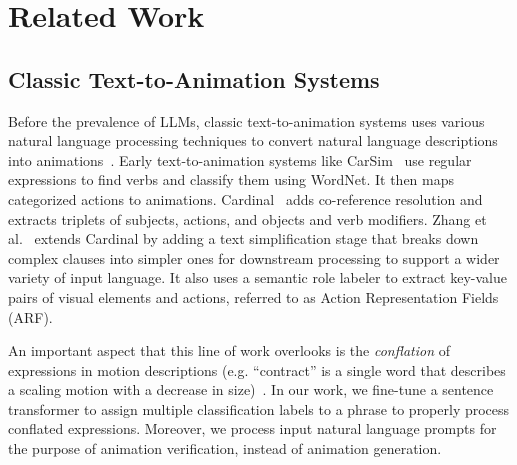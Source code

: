\section{Related Work}
\label{sec:related}


\subsection{Classic Text-to-Animation Systems}
Before the prevalence of LLMs, classic text-to-animation systems uses various natural language processing techniques to convert natural language descriptions into animations~\cite{bouali2023review}.
%
Early text-to-animation systems like CarSim~\cite{aakerberg2003carsim} use regular expressions to find verbs and classify them using WordNet.
It then maps categorized actions to animations.
%
Cardinal~\cite{marti2018cardinal} adds co-reference resolution and extracts triplets of subjects, actions, and objects and verb modifiers.
%
Zhang et al.~ extends Cardinal by adding a text simplification stage that breaks down complex clauses into simpler ones for downstream processing to support a wider variety of input language.
It also uses a semantic role labeler to extract key-value pairs of visual elements and actions, referred to as Action Representation Fields (ARF).

An important aspect that this line of work overlooks is the \textit{conflation} of expressions in motion descriptions (e.g. ``contract'' is a single word that describes a scaling motion with a decrease in size)~\cite{talmy1975motion}.
In our work, we fine-tune a sentence transformer to assign multiple classification labels to a phrase to properly process conflated expressions.
Moreover, we process input natural language prompts for the purpose of animation verification, instead of animation generation.


